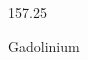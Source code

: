 \documentclass[12pt]{article}
\begin{document}
\hfill{}
\vfill
\begin{center}
  {\fontsize{50}{60}
  }

  \vspace{1em}

  157.25

Gadolinium
\end{center}
\vfill
\end{document}
